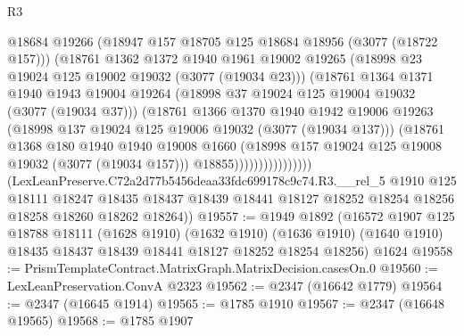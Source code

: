 \begin{lexlean}{R3}
\begin{coremodule}
                              @18684
                              @19266
                              (@18947 @157 @18705 @125 @18684 @18956 (@3077 (@18722 @157)))
                              (@18761
                                @1362
                                @1372
                                @1940
                                @1961
                                @19002
                                @19265
                                (@18998 @23 @19024 @125 @19002 @19032 (@3077 (@19034 @23)))
                                (@18761
                                  @1364
                                  @1371
                                  @1940
                                  @1943
                                  @19004
                                  @19264
                                  (@18998 @37 @19024 @125 @19004 @19032 (@3077 (@19034 @37)))
                                  (@18761
                                    @1366
                                    @1370
                                    @1940
                                    @1942
                                    @19006
                                    @19263
                                    (@18998 @137 @19024 @125 @19006 @19032 (@3077 (@19034 @137)))
                                    (@18761
                                      @1368
                                      @180
                                      @1940
                                      @1940
                                      @19008
                                      @1660
                                      (@18998 @157 @19024 @125 @19008 @19032 (@3077 (@19034 @157)))
                                      @18855))))))))))))))))
      (LexLeanPreserve.C72a2d77b5456deaa33fdc699178c9c74.R3.__rel_5
        @1910
        @125
        @18111
        @18247
        @18435
        @18437
        @18439
        @18441
        @18127
        @18252
        @18254
        @18256
        @18258
        @18260
        @18262
        @18264))
@19557 := @1949
    @1892
    (@16572
      @1907
      @125
      @18788
      @18111
      (@1628 @1910)
      (@1632 @1910)
      (@1636 @1910)
      (@1640 @1910)
      @18435
      @18437
      @18439
      @18441
      @18127
      @18252
      @18254
      @18256)
    @1624
@19558 := PrismTemplateContract.MatrixGraph.MatrixDecision.casesOn.{0}
@19560 := LexLeanPreservation.ConvA @2323
@19562 := @2347 (@16642 @1779)
@19564 := @2347 (@16645 @1914)
@19565 := @1785 @1910
@19567 := @2347 (@16648 @19565)
@19568 := @1785 @1907

\end{coremodule}
\end{lexlean}

